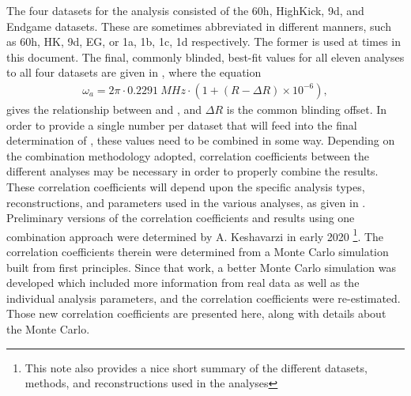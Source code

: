 The four datasets for the \Rone analysis consisted of the 60h, HighKick, 9d, and Endgame datasets. These are sometimes abbreviated in different manners, such as 60h, HK, 9d, EG, or 1a, 1b, 1c, 1d respectively. The former is used at times in this document. The final, commonly blinded, best-fit \R values for all eleven analyses to all four datasets are given in , where the equation
\begin{align}
  \omega_{a} = 2\pi \cdot \SI{0.2291}{MHz} \cdot (1 + (R - \Delta R) \times 10^{-6}),
\label{eq:wa}
\end{align}
gives the relationship between \wa and \R, and $\Delta R$ is the common blinding offset. In order to provide a single \wa number per dataset that will feed into the final determination of \amu, these \R values need to be combined in some way. Depending on the combination methodology adopted, correlation coefficients between the different analyses may be necessary in order to properly combine the results. These correlation coefficients will depend upon the specific analysis types, reconstructions, and parameters used in the various analyses, as given in . Preliminary versions of the correlation coefficients and results using one combination approach were determined by A. Keshavarzi in early 2020 \cite{AlexCombinationNote}\footnote{This note also provides a nice short summary of the different datasets, methods, and reconstructions used in the analyses}. The correlation coefficients therein were determined from a Monte Carlo simulation built from first principles. Since that work, a better Monte Carlo simulation was developed which included more information from real data as well as the individual analysis parameters, and the correlation coefficients were re-estimated. Those new correlation coefficients are presented here, along with details about the Monte Carlo.


